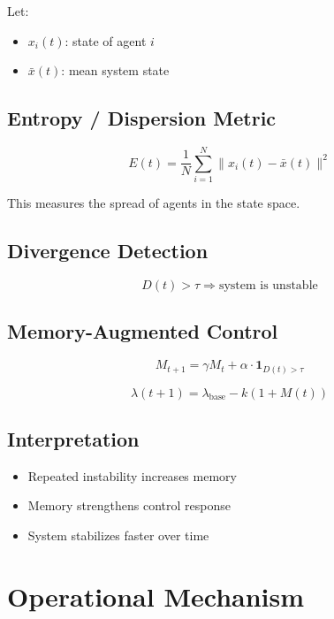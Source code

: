 \documentclass[11pt]{article}
\begin{document}
Let:
\begin{itemize}
\item $x_i(t)$: state of agent $i$
\item $\bar{x}(t)$: mean system state
\end{itemize}

\subsection{Entropy / Dispersion Metric}

\begin{equation}
E(t) = \frac{1}{N} \sum_{i=1}^{N} \|x_i(t) - \bar{x}(t)\|^2
\end{equation}

This measures the spread of agents in the state space.

\subsection{Divergence Detection}

\begin{equation}
D(t) > \tau \Rightarrow \text{system is unstable}
\end{equation}

\subsection{Memory-Augmented Control}

\begin{equation}
M_{t+1} = \gamma M_t + \alpha \cdot \mathbf{1}_{D(t) > \tau}
\end{equation}

\begin{equation}
\lambda(t+1) = \lambda_{\text{base}} - k (1 + M(t))
\end{equation}

\subsection{Interpretation}

\begin{itemize}
\item Repeated instability increases memory
\item Memory strengthens control response
\item System stabilizes faster over time
\end{itemize}

\section{Operational Mechanism}
\end{document}
